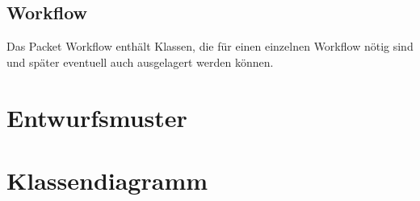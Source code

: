 \subsection{Workflow}
Das Packet Workflow enthält Klassen, die für einen einzelnen Workflow nötig sind und später eventuell auch ausgelagert werden können.
\section{Entwurfsmuster}

\section{Klassendiagramm}

